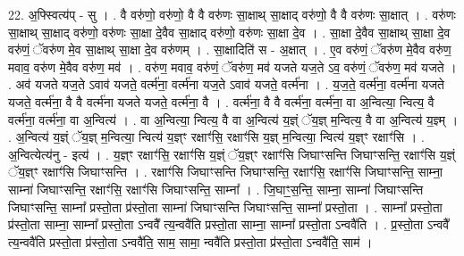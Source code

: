 \documentclass[17pt]{extarticle}
\begin{document}
22. अ॒फ्स्वित्य॑प् - सु । . वै वरु॑णो॒ वरु॑णो॒ वै वै वरु॑णः सा॒क्षाथ् सा॒क्षाद् वरु॑णो॒ वै वै वरु॑णः सा॒क्षात् । . वरु॑णः सा॒क्षाथ् सा॒क्षाद् वरु॑णो॒ वरु॑णः सा॒क्षा दे॒वैव सा॒क्षाद् वरु॑णो॒ वरु॑णः सा॒क्षा दे॒व । . सा॒क्षा दे॒वैव सा॒क्षाथ् सा॒क्षा दे॒व वरु॑णं॒ ॅवरु॑ण मे॒व सा॒क्षाथ् सा॒क्षा दे॒व वरु॑णम् । . सा॒क्षादिति॑ स - अ॒क्षात् । . ए॒व वरु॑णं॒ ॅवरु॑ण मे॒वैव वरु॑ण॒ मवाव॒ वरु॑ण मे॒वैव वरु॑ण॒ मव॑ । . वरु॑ण॒ मवाव॒ वरु॑णं॒ ॅवरु॑ण॒ मव॑ यजते यज॒ते ऽव॒ वरु॑णं॒ ॅवरु॑ण॒ मव॑ यजते । . अव॑ यजते यज॒ते ऽवाव॑ यजते॒ वर्त्म॑ना॒ वर्त्म॑ना यज॒ते ऽवाव॑ यजते॒ वर्त्म॑ना । . य॒ज॒ते॒ वर्त्म॑ना॒ वर्त्म॑ना यजते यजते॒ वर्त्म॑ना॒ वै वै वर्त्म॑ना यजते यजते॒ वर्त्म॑ना॒ वै । . वर्त्म॑ना॒ वै वै वर्त्म॑ना॒ वर्त्म॑ना॒ वा अ॒न्वित्या॒ न्वित्य॒ वै वर्त्म॑ना॒ वर्त्म॑ना॒ वा अ॒न्वित्य॑ । . वा अ॒न्वित्या॒ न्वित्य॒ वै वा अ॒न्वित्य॑ य॒ज्ञ्ं ॅय॒ज्ञ् म॒न्वित्य॒ वै वा अ॒न्वित्य॑ य॒ज्ञ्म् । . अ॒न्वित्य॑ य॒ज्ञ्ं ॅय॒ज्ञ् म॒न्वित्या॒ न्वित्य॑ य॒ज्ञ्ꣳ रक्षाꣳ॑सि॒ रक्षाꣳ॑सि य॒ज्ञ् म॒न्वित्या॒ न्वित्य॑ य॒ज्ञ्ꣳ रक्षाꣳ॑सि । . अ॒न्वित्येत्य॑नु - इत्य॑ । . य॒ज्ञ्ꣳ रक्षाꣳ॑सि॒ रक्षाꣳ॑सि य॒ज्ञ्ं ॅय॒ज्ञ्ꣳ रक्षाꣳ॑सि जिघाꣳसन्ति जिघाꣳसन्ति॒ रक्षाꣳ॑सि य॒ज्ञ्ं ॅय॒ज्ञ्ꣳ रक्षाꣳ॑सि जिघाꣳसन्ति । . रक्षाꣳ॑सि जिघाꣳसन्ति जिघाꣳसन्ति॒ रक्षाꣳ॑सि॒ रक्षाꣳ॑सि जिघाꣳसन्ति॒ साम्ना॒ साम्ना॑ जिघाꣳसन्ति॒ रक्षाꣳ॑सि॒ रक्षाꣳ॑सि जिघाꣳसन्ति॒ साम्ना᳚ । . जि॒घाꣳ॒॒स॒न्ति॒ साम्ना॒ साम्ना॑ जिघाꣳसन्ति जिघाꣳसन्ति॒ साम्ना᳚ प्रस्तो॒ता प्र॑स्तो॒ता साम्ना॑ जिघाꣳसन्ति जिघाꣳसन्ति॒ साम्ना᳚ प्रस्तो॒ता । . साम्ना᳚ प्रस्तो॒ता प्र॑स्तो॒ता साम्ना॒ साम्ना᳚ प्रस्तो॒ता ऽन्ववै᳚ त्य॒न्ववै॑ति प्रस्तो॒ता साम्ना॒ साम्ना᳚ प्रस्तो॒ता ऽन्ववै॑ति । . प्र॒स्तो॒ता ऽन्ववै᳚ त्य॒न्ववै॑ति प्रस्तो॒ता प्र॑स्तो॒ता ऽन्ववै॑ति॒ साम॒ सामा॒ न्ववै॑ति प्रस्तो॒ता प्र॑स्तो॒ता ऽन्ववै॑ति॒ साम॑ । \newline
\end{document}
